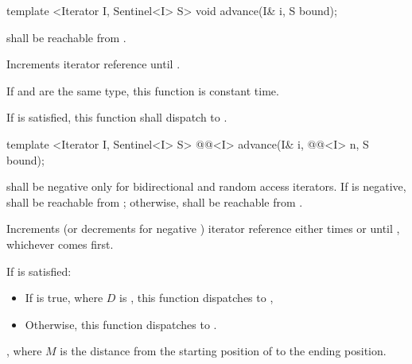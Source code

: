 \begin{addedblock}
\begin{itemdecl}
template <Iterator I, Sentinel<I> S>
  void advance(I& i, S bound);
\end{itemdecl}

\begin{itemdescr}
\pnum
\requires
{} shall be reachable from .

\pnum
\effects
Increments iterator reference  until
.

\pnum
If  and  are the same type, this function
is constant time.

\pnum
If  is satisfied, this function shall
dispatch to .
\end{itemdescr}

\begin{itemdecl}
template <Iterator I, Sentinel<I> S>
  @@<I> advance(I& i, @@<I> n, S bound);
\end{itemdecl}

\begin{itemdescr}
\pnum
\requires
{}
shall be negative only for bidirectional and random access iterators. If  is
negative,  shall be reachable from ; otherwise, 
shall be reachable from .

\pnum
\effects
Increments (or decrements for negative ) iterator reference  either
 times or until , whichever comes first.

\pnum
If  is satisfied:

\begin{itemize}
\item If  is true, where $D$ is ,
this function dispatches to ,
\item Otherwise, this function dispatches to .
\end{itemize}

\pnum
\returns
{}, where $M$ is the distance from the starting position of  to
the ending position.
\end{itemdescr}
\end{addedblock}

